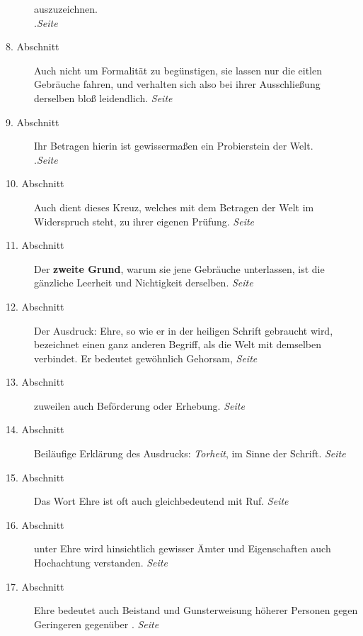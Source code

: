 \begin{description}
auszuzeichnen.\\
.\dotfill \textit{Seite~\pageref{kap9_ab7}}\\
\item[8. Abschnitt] Auch nicht um Formalität zu begünstigen, sie lassen nur die
eitlen Gebräuche fahren, und verhalten sich also bei ihrer Ausschließung
derselben bloß leidendlich.
\dotfill \textit{Seite~\pageref{kap9_ab8}}\\
\item[9. Abschnitt] Ihr Betragen hierin ist gewissermaßen ein Probierstein der
Welt.\\
.\dotfill \textit{Seite~\pageref{kap9_ab9}}\\
\item[10. Abschnitt] Auch dient dieses Kreuz, welches mit dem Betragen der Welt
im Widerspruch steht, zu ihrer eigenen Prüfung.
\dotfill \textit{Seite~\pageref{kap9_ab10}}\\
\item[11. Abschnitt] Der \textbf{zweite Grund}, warum sie jene Gebräuche
unterlassen, ist
die gänzliche Leerheit und Nichtigkeit derselben.
\dotfill \textit{Seite~\pageref{kap9_ab11}}\\
\item[12. Abschnitt] Der Ausdruck: Ehre, so wie er in der heiligen Schrift
gebraucht wird, bezeichnet einen ganz anderen Begriff, als die Welt mit
demselben
verbindet. Er bedeutet gewöhnlich Gehorsam,
\dotfill \textit{Seite~\pageref{kap9_ab12}}\\
\item[13. Abschnitt] zuweilen auch Beförderung oder Erhebung.
\dotfill \textit{Seite~\pageref{kap9_ab13}}\\
\item[14. Abschnitt] Beiläufige Erklärung des Ausdrucks: \textit{Torheit}, im
Sinne
der Schrift.
\dotfill \textit{Seite~\pageref{kap9_ab14}}\\
\item[15. Abschnitt] Das Wort Ehre ist oft auch gleichbedeutend mit Ruf.
\dotfill \textit{Seite~\pageref{kap9_ab15}}\\
\item[16. Abschnitt] unter Ehre wird hinsichtlich gewisser Ämter und
Eigenschaften auch Hochachtung verstanden.
\dotfill \textit{Seite~\pageref{kap9_ab16}}\\
\item[17. Abschnitt] Ehre bedeutet auch Beistand und Gunsterweisung höherer
Personen gegen Geringeren gegenüber
.
\dotfill \textit{Seite~\pageref{kap9_ab17}}\\

\end{description}
